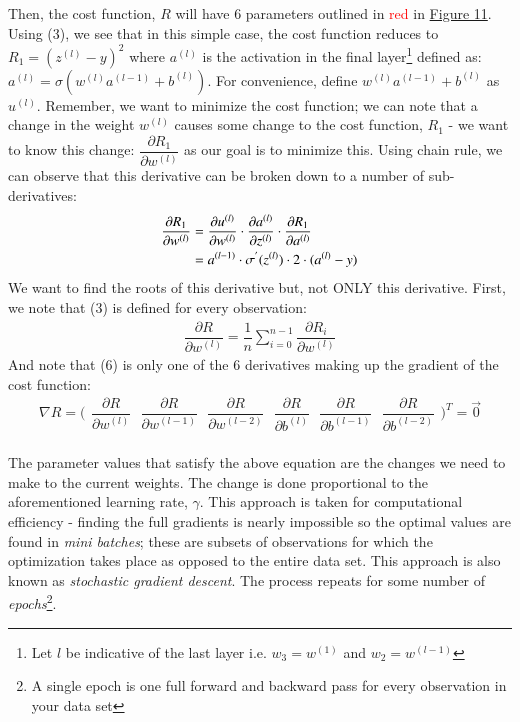 \documentclass{article}
\begin{document}
\noindent Then, the cost function, $R$ will have 6 parameters outlined in \textcolor{red}{red} in \hyperref[fig:schema]{Figure 11}. Using (3), we see that in this simple case, the cost function reduces to $R_{1} = (z^{(l)} - y)^2$ where $a^{(l)}$ is the activation in the final layer\footnote{Let $l$ be indicative of the last layer i.e. $w_3 = w^{(1)}$ and $w_2 = w^{(l - 1)}$} defined as: $a^{(l)} = \sigma(w^{(l)}a^{(l - 1)} + b^{(l)})$. For convenience, define $w^{(l)}a^{(l - 1)} + b^{(l)}$ as $u^{(l)}$. Remember, we want to minimize the cost function; we can note that a change in the weight $w^{(l)}$ causes some change to the cost function, $R_{1}$ - we want to know this change: $\dfrac{\partial R_1}{\partial w^{(l)}}$ as our goal is to minimize this. Using chain rule, we can observe that this derivative can be broken down to a number of sub-derivatives:
\begin{align}
    \dfrac{\partial R_1}{\partial w^{(l)}} &= \dfrac{\partial u^{(l)}}{\partial w^{(l)}}\cdot\dfrac{\partial a^{(l)}}{\partial z^{(l)}}\cdot\dfrac{\partial R_{1}}{\partial a^{(l)}}\\ \vspace{3em}
    &= a^{(l - 1)}\cdot\sigma^{'}(z^{(l)})\cdot2\cdot(a^{(l)} - y)
\end{align}
\noindent We want to find the roots of this derivative but, not ONLY this derivative. First, we note that (3) is defined for every observation: 
\begin{align}
    \dfrac{\partial R}{\partial w^{(l)}} = \dfrac{1}{n}\sum_{i = 0}^{n - 1}\dfrac{\partial R_i}{\partial w^{(l)}}
\end{align}
\noindent And note that (6) is only one of the 6 derivatives making up the gradient of the cost function:
\[\nabla R = \Bigg( \begin{array}{cc}

\dfrac{\partial R}{\partial w^{(l)}} \ \ \
\dfrac{\partial R}{\partial w^{(l - 1)}} \ \ \ 
\dfrac{\partial R}{\partial w^{(l - 2)}} \ \ \ 
\dfrac{\partial R}{\partial b^{(l)}} \ \ \
\dfrac{\partial R}{\partial b^{(l - 1)}} \ \ \
\dfrac{\partial R}{\partial b^{(l - 2)}}
\end{array} \Bigg)^{T} = \textbf{$\vec{0}$}\] \\
\noindent The parameter values that satisfy the above equation are the changes we need to make to the current weights. The change is done proportional to the aforementioned learning rate, $\gamma$. This approach is taken for computational efficiency - finding the full gradients is nearly impossible so the optimal values are found in \textit{mini batches}; these are subsets of observations for which the optimization takes place as opposed to the entire data set. This approach is also known as \textit{stochastic gradient descent}. The process repeats for some number of \textit{epochs}\footnote{A single epoch is one full forward and backward pass for every observation in your data set}. 
\end{document}
